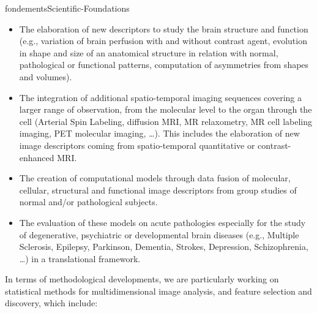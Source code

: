 \documentclass{ra2018}
\begin{document}
\begin{module}{fondements}{Scientific-Foundations}{}
        \begin{itemize}
          \item The elaboration of new descriptors to study the brain structure and
          function (e.g., variation of brain perfusion with and without contrast agent,
          evolution in shape and size of an anatomical structure in relation with
          normal, pathological or functional patterns, computation of asymmetries from
          shapes and volumes).
          \item The integration of additional spatio-temporal imaging sequences
          covering a larger range of observation, from the molecular level to the organ
          through the cell (Arterial Spin Labeling, diffusion MRI, MR relaxometry, MR
          cell labeling imaging, PET molecular imaging, …). This includes the
          elaboration of new image descriptors coming from spatio-temporal quantitative
          or contrast-enhanced MRI.
          \item The creation of computational models through data fusion of molecular,
          cellular, structural and functional image descriptors from group studies of
          normal and/or pathological subjects.
          \item The evaluation of these models on acute pathologies especially for the
          study of degenerative, psychiatric or developmental brain diseases (e.g.,
          Multiple Sclerosis, Epilepsy, Parkinson, Dementia, Strokes, Depression,
          Schizophrenia, …) in a translational framework.
        \end{itemize}
        
        In terms of methodological developments, we are particularly working on
        statistical methods for multidimensional image analysis, and feature selection
        and discovery, which include:
        

\end{module}
\end{document}
